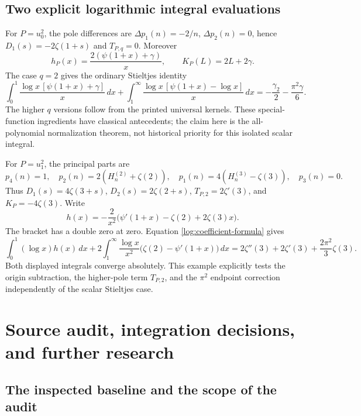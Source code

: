 \documentclass[11pt,letterpaper]{article}
\numberwithin{equation}{section}
\theoremstyle{plain}
\theoremstyle{definition}
\theoremstyle{remark}
\begin{document}
\subsection{Two explicit logarithmic integral evaluations}

For $P=u_0^2$, the pole differences are
$\Delta p_1(n)=-2/n$, $\Delta p_2(n)=0$, hence
$D_1(s)=-2\zeta(1+s)$ and $T_{P,q}=0$.
Moreover
\[
 h_P(x)=\frac{2(\psi(1+x)+\gamma)}x,\qquad
 K_P(L)=2L+2\gamma.
\]
The case $q=2$ gives the ordinary Stieltjes identity
\begin{equation}\label{log:gamma2}
 \boxed{\displaystyle
 \int_0^1\frac{\log x\,[\psi(1+x)+\gamma]}x\,dx
 +\int_1^\infty\frac{\log x\,[\psi(1+x)-\log x]}x\,dx
 =-\frac{\gamma_2}{2}-\frac{\pi^2\gamma}{6}.}
\end{equation}
The higher $q$ versions follow from the printed universal kernels.
These special-function ingredients have classical antecedents; the
claim here is the all-polynomial normalization theorem, not historical
priority for this isolated scalar integral.

For $P=u_1^2$, the principal parts are
\[
 p_4(n)=1,\quad p_2(n)=2(H_n^{(2)}+\zeta(2)),\quad
 p_1(n)=4(H_n^{(3)}-\zeta(3)),\quad p_3(n)=0.
\]
Thus $D_1(s)=4\zeta(3+s)$, $D_2(s)=2\zeta(2+s)$,
$T_{P,2}=2\zeta'(3)$, and $K_P=-4\zeta(3)$.
Write
\[
 h(x)=-\frac{2}{x^2}
        \bigl(\psi'(1+x)-\zeta(2)+2\zeta(3)x\bigr).
\]
The bracket has a double zero at zero. Equation
\eqref{log:coefficient-formula} gives
\begin{equation}\label{log:trigamma-square}
 \boxed{\displaystyle
 \int_0^1(\log x)h(x)\,dx
 +2\int_1^\infty\frac{\log x}{x^2}
          \bigl(\zeta(2)-\psi'(1+x)\bigr)\,dx
 =2\zeta''(3)+2\zeta'(3)+\frac{2\pi^2}{3}\zeta(3).}
\end{equation}
Both displayed integrals converge absolutely. This example explicitly
tests the origin subtraction, the higher-pole term $T_{P,2}$, and the
$\pi^2$ endpoint correction independently of the scalar Stieltjes case.


\section{Source audit, integration decisions, and further research}
\label{audit:integration-section}

\subsection{The inspected baseline and the scope of the audit}
\label{audit:baseline}
\end{document}
